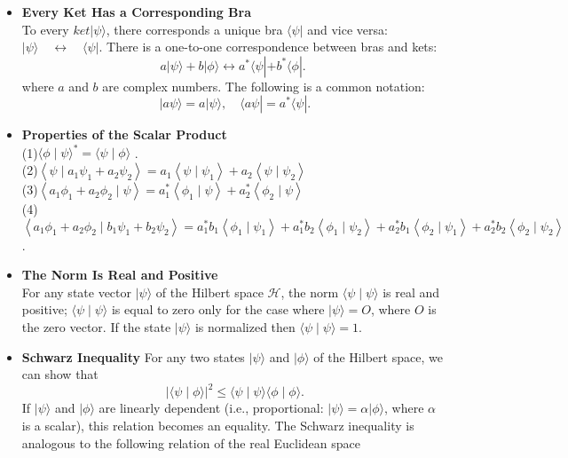 \begin{itemize}
	\item \textbf{ Every Ket Has a Corresponding Bra}\\
	To every $k e t|\psi\rangle$, there corresponds a unique bra $\langle\psi|$ and vice versa:
	$|\psi\rangle \quad \longleftrightarrow \quad\langle\psi|$.
	There is a one-to-one correspondence between bras and kets:
	$$
	a|\psi\rangle+b|\phi\rangle \longleftrightarrow a^{*}\langle\psi|+b^{*}\langle\phi| \text {. }
	$$
	where $a$ and $b$ are complex numbers. The following is a common notation:
	$$
	|a \psi\rangle=a|\psi\rangle, \quad\langle a \psi|=a^{*}\langle\psi| .
	$$
	\item \textbf{Properties of the Scalar Product}\\
	(1)$\langle\phi \mid \psi\rangle^{*}=\langle\psi \mid \phi\rangle $ .\\
	(2)$\left\langle\psi \mid a_{1} \psi_{1}+a_{2} \psi_{2}\right\rangle= a_{1}\left\langle\psi \mid \psi_{1}\right\rangle+a_{2}\left\langle\psi \mid \psi_{2}\right\rangle $\\
	(3)$\left\langle a_{1} \phi_{1}+a_{2} \phi_{2} \mid \psi\right\rangle= a_{1}^{*}\left\langle\phi_{1} \mid \psi\right\rangle+a_{2}^{*}\left\langle\phi_{2} \mid \psi\right\rangle $\\
		(4)$\left\langle a_{1} \phi_{1}+a_{2} \phi_{2} \mid b_{1} \psi_{1}+b_{2} \psi_{2}\right\rangle= a_{1}^{*} b_{1}\left\langle\phi_{1} \mid \psi_{1}\right\rangle+a_{1}^{*} b_{2}\left\langle\phi_{1} \mid \psi_{2}\right\rangle 
		+a_{2}^{*} b_{1}\left\langle\phi_{2} \mid \psi_{1}\right\rangle+a_{2}^{*} b_{2}\left\langle\phi_{2} \mid \psi_{2}\right\rangle$ .
\item \textbf{ The Norm Is Real and Positive}\\
For any state vector $|\psi\rangle$ of the Hilbert space $\mathcal{H}$, the norm $\langle\psi \mid \psi\rangle$ is real and positive; $\langle\psi \mid \psi\rangle$ is equal to zero only for the case where $|\psi\rangle=O$, where $O$ is the zero vector. If the state $|\psi\rangle$ is normalized then $\langle\psi \mid \psi\rangle=1$.
\item \textbf{Schwarz Inequality}
For any two states $|\psi\rangle$ and $|\phi\rangle$ of the Hilbert space, we can show that
$$
|\langle\psi \mid \phi\rangle|^{2} \leq\langle\psi \mid \psi\rangle\langle\phi \mid \phi\rangle .
$$
If $|\psi\rangle$ and $|\phi\rangle$ are linearly dependent (i.e., proportional: $|\psi\rangle=\alpha|\phi\rangle$, where $\alpha$ is a scalar), this relation becomes an equality. The Schwarz inequality  is analogous to the following relation of the real Euclidean space

\end{itemize}
